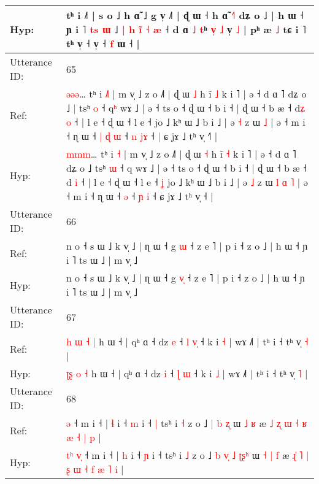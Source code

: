 \documentclass[10pt]{article}
\DeclareRobustCommand{\hl}[1]{{\textcolor{red}{#1}}}
\begin{document}
\begin{longtable}{ll}
 \\
Hyp: & tʰ i ˩˥ | s o ˩ h ɑ̃ ˩ g v̩ ˩˥ | ɖ ɯ ˧ h ɑ̃ \hl{˧}\hl{˥} dʑ o ˩ | h ɯ ˧ ɲ i ˥ \hl{t}\hl{s} \hl{ɯ} ˩ \hl{}\hl{|} \hl{h} \hl{i}\hl{̃} \hl{˧} \hl{æ} ˧ d ɑ\hl{}\hl{} \hl{˩} \hl{}\hl{t}ʰ \hl{v}\hl{̩} \hl{˩} v̩ \hl{˩} | pʰ æ \hl{˩} tɕ i ˥\hl{}\hl{} tʰ v̩ ˧ v̩ ˧\hl{}\hl{} \hl{f} ɯ ˧ |
 \\
\midrule
Utterance ID: & 65 \\
Ref: & \hl{ə}\hl{ə}\hl{ə}… tʰ i \hl{˩}\hl{˥} | m v̩ ˩ z o ˩˥ | ɖ ɯ \hl{˩} h ĩ \hl{˩} k i ˥ | ə ˧ d ɑ ˥ dʑ o ˩\hl{ }\hl{|} tsʰ \hl{o} ˧ q\hl{ʰ} wɤ ˩ | ə ˧ ts o ˧ ɖ ɯ ˧ b i ˧ | ɖ ɯ ˧ b æ ˧ d\hl{ʑ} \hl{o} ˧ | l e ˧ ɖ ɯ ˧ l e ˧\hl{}\hl{} jo ˩ kʰ ɯ ˩ b i ˩ | ə \hl{˧} z ɯ\hl{}\hl{}\hl{}\hl{} \hl{˩} | ə ˧ m i ˧ ɳ ɯ ˧\hl{ }\hl{|}\hl{ }\hl{ɖ} \hl{ɯ} ˧ \hl{n} \hl{j}\hl{ɤ} ˧\hl{ }\hl{|} ɕ jɤ ˩ tʰ v̩ ˧\hl{˥} |
 \\
Hyp: & \hl{m}\hl{m}\hl{m}… tʰ i \hl{}\hl{˧} | m v̩ ˩ z o ˩˥ | ɖ ɯ \hl{˧} h ĩ \hl{˧} k i ˥ | ə ˧ d ɑ ˥ dʑ o ˩\hl{}\hl{} tsʰ \hl{ɯ} ˧ q\hl{} wɤ ˩ | ə ˧ ts o ˧ ɖ ɯ ˧ b i ˧ | ɖ ɯ ˧ b æ ˧ d\hl{} \hl{i} ˧ | l e ˧ ɖ ɯ ˧ l e ˧\hl{ }\hl{ʝ} jo ˩ kʰ ɯ ˩ b i ˩ | ə \hl{˩} z ɯ\hl{ }\hl{l}\hl{ }\hl{ɑ} \hl{˥} | ə ˧ m i ˧ ɳ ɯ ˧\hl{}\hl{}\hl{}\hl{} \hl{ə} ˧ \hl{ɲ} \hl{}\hl{i} ˧\hl{}\hl{} ɕ jɤ ˩ tʰ v̩ ˧\hl{} |
 \\
\midrule
Utterance ID: & 66 \\
Ref: & n o ˧ s ɯ ˩ k v̩ ˩ | ɳ ɯ ˧ g \hl{}\hl{ɯ} ˧ z e ˥ | p i ˧ z o ˩ | h ɯ ˧ ɲ i ˥ ts ɯ ˩ | m v̩ ˩
 \\
Hyp: & n o ˧ s ɯ ˩ k v̩ ˩ | ɳ ɯ ˧ g \hl{v}\hl{̩} ˧ z e ˥ | p i ˧ z o ˩ | h ɯ ˧ ɲ i ˥ ts ɯ ˩ | m v̩ ˩
 \\
\midrule
Utterance ID: & 67 \\
Ref: & \hl{h}\hl{ }\hl{ɯ} \hl{˧} \hl{|} h ɯ ˧ | qʰ ɑ ˧ dz \hl{e} ˧ \hl{l} \hl{v}\hl{̩} ˧ k i \hl{˧} | wɤ ˩˥ | tʰ i ˧ tʰ v̩ \hl{˧} |
 \\
Hyp: & \hl{}\hl{ʈ}\hl{ʂ} \hl{o} \hl{˧} h ɯ ˧ | qʰ ɑ ˧ dz \hl{i} ˧ \hl{ɭ} \hl{}\hl{ɯ} ˧ k i \hl{˩} | wɤ ˩˥ | tʰ i ˧ tʰ v̩ \hl{˥} |
 \\
\midrule
Utterance ID: & 68 \\
Ref: & \hl{}\hl{}\hl{}\hl{}\hl{ə} ˧ m i ˧ | \hl{ɬ} i ˧ \hl{m} i ˧\hl{ }\hl{|} tsʰ i \hl{˧} z o ˩\hl{}\hl{} \hl{}\hl{|} \hl{b} \hl{}\hl{}\hl{ʐ} ɯ\hl{}\hl{} \hl{˩} \hl{ʁ} æ\hl{}\hl{}\hl{} \hl{˩} \hl{ʐ} \hl{ɯ} \hl{˧} \hl{ʁ} \hl{æ} \hl{˧} \hl{|} \hl{p} |
 \\
Hyp: & \hl{t}\hl{ʰ}\hl{ }\hl{v}\hl{̩} ˧ m i ˧ | \hl{h} i ˧ \hl{ɲ} i ˧\hl{}\hl{} tsʰ i \hl{˩} z o ˩\hl{ }\hl{b} \hl{v}\hl{̩} \hl{˩} \hl{ʈ}\hl{ʂ}\hl{ʰ} ɯ\hl{ }\hl{˧} \hl{|} \hl{f} æ\hl{ }\hl{ɻ}\hl{̍} \hl{˥} \hl{|} \hl{ʂ} \hl{ɯ} \hl{˧} \hl{f} \hl{æ} \hl{˥} \hl{i} |

\end{longtable}
\end{document}
